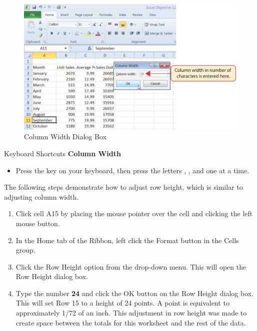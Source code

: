 \begin{figure}[H]
	\centering
	\includegraphics[width=\maxwidth{.95\linewidth}]{gfx/ch01_fig24}
	\caption{Column Width Dialog Box}
	\label{01:fig24}
\end{figure}

\begin{center}
	\begin{shtcutbox}{Keyboard Shortcuts}
		\textbf{Column Width}
		\\
		\begin{itemize}
			\setlength{\itemsep}{0pt}
			\setlength{\parskip}{0pt}
			\setlength{\parsep}{0pt}
			
			\item Press the  key on your keyboard, then press the letters , , and  one at a time.
			
		\end{itemize}
	\end{shtcutbox}
\end{center}

The following steps demonstrate how to adjust row height, which is similar to adjusting column width.

\begin{enumerate}
	\item Click cell \textsf{A15} by placing the mouse pointer over the cell and clicking the left mouse button.
	\item In the Home tab of the Ribbon, left click the Format button in the Cells group.
	\item Click the Row Height option from the drop-down menu. This will open the Row Height dialog box.
	\item Type the number \textbf{24} and click the OK button on the Row Height dialog box. This will set Row 15 to a height of 24 points. A point is equivalent to approximately 1/72 of an inch. This adjustment in row height was made to create space between the totals for this worksheet and the rest of the data.
\end{enumerate}

